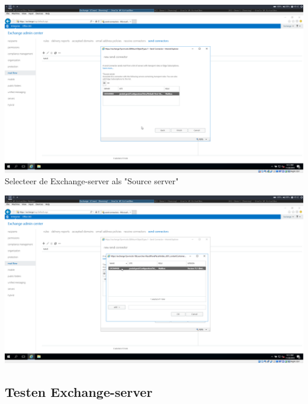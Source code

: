 \documentclass[a4paper]{article}
\begin{document}
\begin{center}
	\includegraphics[width=15cm]{Pictures/Exchange/config/1543425170.png}
	Selecteer de Exchange-server als "Source server"
\end{center}
\begin{center}
	\includegraphics[width=15cm]{Pictures/Exchange/config/1543425167.png}
\end{center}

\subsection{Testen Exchange-server}
\end{document}
